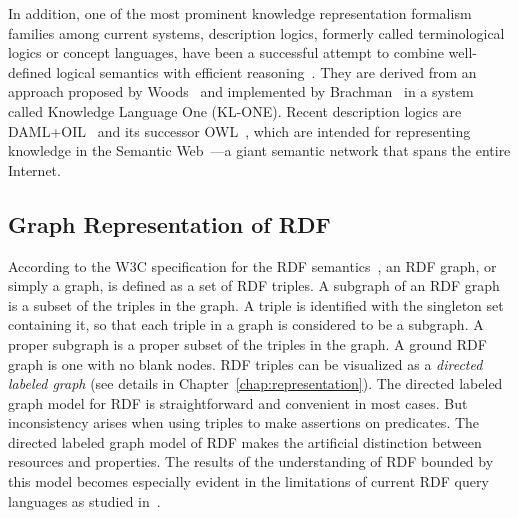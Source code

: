 In addition, one of the most prominent knowledge representation formalism families among current systems, description logics, formerly called terminological logics or concept languages, have been a successful attempt to combine well-defined logical semantics with efficient reasoning~\cite{Sowa91principlesof}. They are derived from an approach proposed by Woods~\cite{woods75link} and implemented by Brachman~\cite{Brachman91livingwith} in a system called Knowledge Language One (KL-ONE). %
Recent description logics are DAML+OIL~\cite{Horrocks02daml+oil} and its successor OWL~\cite{OWL}, which are intended for representing knowledge in the Semantic Web~\cite{Berners-Lee01}---a giant semantic network that spans the entire Internet.

\here

\subsection{Graph Representation of RDF}
\label{sec:rdfgraph}
According to the W3C specification for the RDF semantics~\cite{Hayes_rdf2004}, an RDF graph, or simply a graph, is defined as a set of RDF triples. A subgraph of an RDF graph is a subset of the triples in the graph. A triple is identified with the singleton set containing it, so that each triple in a graph is considered to be a subgraph. A proper subgraph is a proper subset of the triples in the graph. A ground RDF graph is one with no blank nodes. RDF triples can be visualized as a \emph{directed labeled graph} (see details in Chapter~\ref{chap:representation}). The directed labeled graph model for RDF is straightforward and convenient in most cases. But inconsistency arises when using triples to make assertions on predicates. The directed labeled graph model of RDF makes the artificial distinction between resources and properties. The results of the understanding of RDF bounded by this model becomes especially evident in the limitations of current RDF query languages as studied in~\cite{Angles04rdfquery}.


